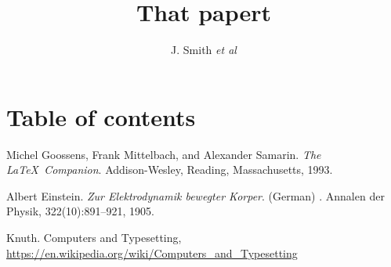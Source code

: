 \documentclass[a4paper]{article}
\begin{document}
\author{J. Smith
\emph{et al}
}
\title{That papert}

\maketitle








\appendix



\section*{Table of contents}
\tableofcontents

\printindex




\begin{thebibliography}{19}
Michel Goossens, Frank Mittelbach, and Alexander Samarin. 
\newblock \textit{The \LaTeX\ Companion}. 
\newblock Addison-Wesley, Reading, Massachusetts, 1993.

Albert Einstein. 
\newblock \textit{Zur Elektrodynamik bewegter Korper}. (German) 
. 
\newblock Annalen der Physik, 322(10):891–921, 1905.

Knuth.
\newblock  Computers and Typesetting,
\newblock \url{https://en.wikipedia.org/wiki/Computers_and_Typesetting}

\end{thebibliography}
\end{document}
